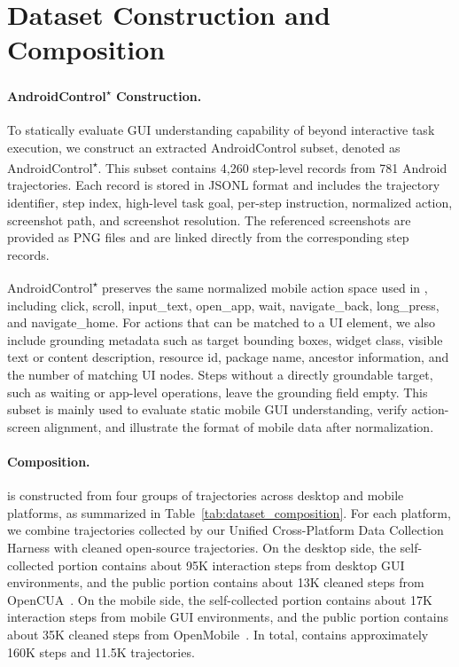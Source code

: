 \appendix

\section{Dataset Construction and Composition}
\label{app:dataset_construction}


\paragraph{AndroidControl\textsuperscript{$\star$} Construction.}
To statically evaluate GUI understanding capability of \METHODNAME beyond
interactive task execution, we construct an extracted AndroidControl
subset, denoted as AndroidControl\textsuperscript{$\star$}. This subset
contains 4,260 step-level records from 781 Android trajectories. Each record
is stored in JSONL format and includes the trajectory identifier, step index,
high-level task goal, per-step instruction, normalized action, screenshot path,
and screenshot resolution. The referenced screenshots are provided as PNG files
and are linked directly from the corresponding step records.

AndroidControl\textsuperscript{$\star$} preserves the same normalized mobile
action space used in \BENCH, including click, scroll, input\_text, open\_app,
wait, navigate\_back, long\_press, and navigate\_home. For actions that can be
matched to a UI element, we also include grounding metadata such as target
bounding boxes, widget class, visible text or content description, resource id,
package name, ancestor information, and the number of matching UI nodes. Steps
without a directly groundable target, such as waiting or app-level operations,
leave the grounding field empty. This subset is mainly used to evaluate static
mobile GUI understanding, verify action-screen alignment, and illustrate the
format of mobile data after normalization.

\paragraph{\BENCH Composition.}

\BENCH is constructed from four groups of trajectories across desktop and
mobile platforms, as summarized in Table~\ref{tab:dataset_composition}. For
each platform, we combine trajectories collected by our Unified
Cross-Platform Data Collection Harness with cleaned open-source
trajectories. On the desktop side, the self-collected portion contains about
95K interaction steps from desktop GUI environments, and the public portion
contains about 13K cleaned steps from OpenCUA~\citep{Opencua}. On the mobile side, the
self-collected portion contains about 17K interaction steps from mobile GUI
environments, and the public portion contains about 35K cleaned steps from
OpenMobile~\citep{openmobile}. In total, \BENCH contains approximately 160K steps and 11.5K
trajectories.

